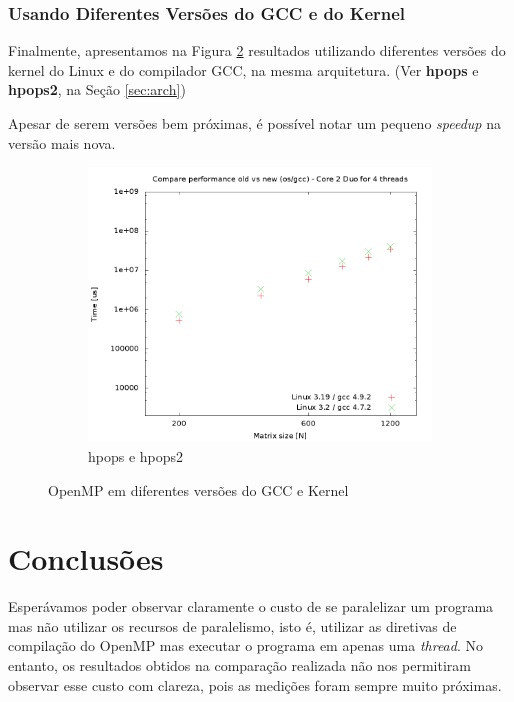 \documentclass[a4paper, 12pt]{article}
\begin{document}
\subsubsection{Usando Diferentes Versões do GCC e do Kernel}

Finalmente, apresentamos na Figura \ref{fig:cmpv} resultados utilizando
diferentes versões do kernel do Linux e do compilador GCC, na mesma
arquitetura. (Ver \textbf{hpops} e \textbf{hpops2}, na Seção \ref{sec:arch})

Apesar de serem versões bem próximas, é possível notar um pequeno
\textit{speedup} na versão mais nova.

\begin{figure}[H]
    \centering
    \begin{subfigure}[H]{0.5\textwidth}
        \includegraphics[width=\textwidth]{compare_old_new_os}
        \caption{hpops e hpops2}
        \label{fig:hpops_hpops2}
    \end{subfigure}%
    \caption{OpenMP em diferentes versões do GCC e Kernel}\label{fig:cmpv}
\end{figure}

\newpage
\section{Conclusões} \label{sec:dis}

Esperávamos poder observar claramente o custo de se paralelizar um programa
mas não utilizar os recursos de paralelismo, isto é,
utilizar as diretivas de compilação do OpenMP mas
executar o programa em apenas uma \textit{thread}. No entanto,
os resultados obtidos na comparação realizada não nos permitiram
observar esse custo com clareza, pois as medições foram
sempre muito próximas.
\end{document}
